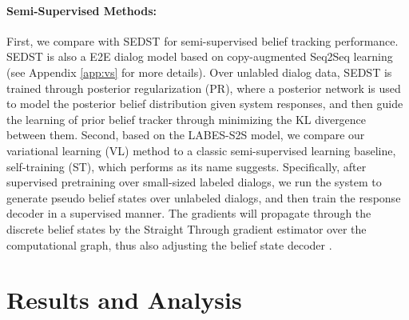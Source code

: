 \documentclass[11pt,a4paper]{article}
\newcommand{\modelname}{LABES}
\begin{document}
\paragraph{Semi-Supervised Methods:}
	\label{sec:baselines}
	First, we compare with SEDST \cite{sedst} for semi-supervised belief tracking performance. SEDST is also a E2E dialog model based on copy-augmented Seq2Seq learning (see Appendix \ref{app:vs} for more details). 
	Over unlabled dialog data, SEDST is trained through posterior regularization (PR), where a posterior network is used to model the posterior belief distribution given system responses, and then guide the learning of prior belief tracker through minimizing the KL divergence between them.
	Second, based on the \modelname{}-S2S model, we compare our variational learning (VL) method to a classic semi-supervised learning baseline, self-training (ST), which performs as its name suggests. Specifically, after supervised pretraining over small-sized labeled dialogs, we run the system to generate pseudo belief states  over unlabeled dialogs, and then train the response decoder  in a supervised manner. The gradients will propagate through the discrete belief states by the Straight Through gradient estimator \cite{bengio2013estimating} over the computational graph, thus also adjusting the belief state decoder .
	


	\section{Results and Analysis}
	
\end{document}
